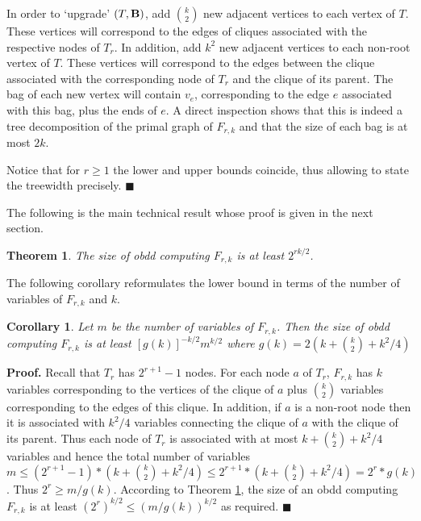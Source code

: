 \documentclass{article}
\newtheorem{theorem}{Theorem}
\newtheorem{corollary}{Corollary}
\begin{document}
In order to `upgrade' $(T,{\bf B})$, add ${k \choose 2}$ new adjacent vertices 
to each vertex of $T$. These vertices will correspond to the edges of cliques associated
with the respective nodes of $T_r$. In addition, add $k^2$ new adjacent vertices to each non-root vertex of $T$. 
These vertices will correspond to the edges between the clique associated with the corresponding node of $T_r$
and the clique of its parent.
The bag of each new vertex will contain $v_e$, corresponding to the edge $e$ associated with this bag, 
plus the ends of $e$. A direct inspection shows that this is indeed a tree decomposition
of the primal graph of $F_{r,k}$ and that the size of each bag is at most $2k$.

Notice that for $r \geq 1$ the lower and upper bounds coincide, thus allowing to state
the treewidth precisely. 
$\blacksquare$

The following is the main technical result whose proof is given in the next section. 
\begin{theorem} \label{maintheor}
The size of {\sc obdd} computing $F_{r,k}$ is at least $2^{rk/2}$.
\end{theorem}


The following corollary reformulates the lower bound in terms of the number of variables of $F_{r,k}$ and $k$.

\begin{corollary} \label{reform1}
Let $m$ be the number of variables of $F_{r,k}$.
Then the size of {\sc obdd} computing $F_{r,k}$ is at least
$[g(k)]^{-k/2}m^{k/2}$ where $g(k)=2(k+{k \choose 2}+k^2/4)$
\end{corollary}

{\bf Proof.}
Recall that $T_r$ has $2^{r+1}-1$ nodes.
For each node $a$ of $T_r$, $F_{r,k}$ has $k$ variables corresponding to the
vertices of the clique of $a$ plus ${k \choose 2}$ variables corresponding to the edges
of this clique. In addition, if $a$ is a non-root node then it is associated with $k^2/4$
variables connecting the clique of $a$ with the clique of its parent. Thus each node of
$T_r$ is associated with at most $k+{k \choose 2}+k^2/4$ variables and hence the total number of
variables $m \leq (2^{r+1}-1)*(k+{k \choose 2}+k^2/4) \leq 2^{r+1}*(k+{k \choose 2}+k^2/4)=2^r*g(k)$.
Thus $2^r \geq m/g(k)$. According to Theorem \ref{maintheor}, the
size of an {\sc obdd} computing $F_{r,k}$ is at least
$(2^r)^{k/2} \leq (m/g(k))^{k/2}$ as required. $\blacksquare$
\end{document}
